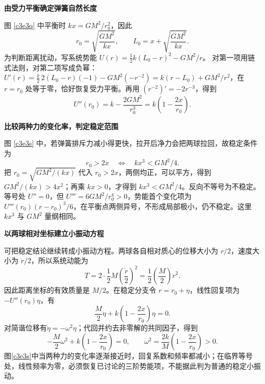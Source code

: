 \begin{solution}\textbf{由受力平衡确定弹簧自然长度}\par\nobreak
图 \ref{c3e3q} 中平衡时 $kx=GM^2/r_0^2$，因此
\[
 r_0=\sqrt{\frac{GM^2}{kx}},\qquad
 \boxed{L_0=x+\sqrt{\frac{GM^2}{kx}}}.
\]
为判断距离扰动，写系统势能
$U(r)=\tfrac12k(L_0-r)^2-GM^2/r$。
对第一项用链式法则，对第二项写成负幂：$U'(r)=\frac k2\,2(L_0-r)(-1)-GM^2(-r^{-2})=k(r-L_0)+GM^2/r^2$，在 $r=r_0$ 处等于零，恰好恢复受力平衡。再用 $(r^{-2})'=-2r^{-3}$，得到
\[
 U''(r_0)=k-\frac{2GM^2}{r_0^3}
 =k\left(1-\frac{2x}{r_0}\right).
\]



\par\medskip{}\noindent\textbf{比较两种力的变化率，判定稳定范围}\par\nobreak
图 \ref{c3e3s} 中，若弹簧排斥力减小得更快，拉开后净力会把两球拉回，故稳定条件为
\[
 r_0>2x\quad\Longleftrightarrow\quad
 \boxed{kx^3<GM^2/4}.
\]
把 $r_0=\sqrt{GM^2/(kx)}$ 代入 $r_0>2x$，两侧均正，可以平方，得到 $GM^2/(kx)>4x^2$；再乘 $kx>0$，才得到 $kx^3<GM^2/4$。反向不等号为不稳定。等号处 $U''=0$，但 $U'''=6GM^2/r_0^4>0$，势能首个变化项为 $U'''(r_0)(r-r_0)^3/6$，在平衡点两侧异号，不形成局部极小，仍不稳定。这里 $kx^3$ 与 $GM^2$ 量纲相同。


\par\medskip{}\noindent\textbf{以两球相对坐标建立小振动方程}\par\nobreak
可把稳定结论继续转成小振动方程。两球各自相对质心的位移大小为 $r/2$，速度大小为 $\dot r/2$，所以系统动能为
\[T=2\cdot\frac12M\left(\frac{\dot r}{2}\right)^2
   =\frac12\left(\frac M2\right)\dot r^2.\]
因此距离坐标的有效质量是 $M/2$。在稳定分支令 $r=r_0+\eta$，线性回复项为 $-U''(r_0)\eta$，有
\[\frac M2\ddot\eta+k\left(1-\frac{2x}{r_0}\right)\eta=0.\]
对简谐位移有$\ddot\eta=-\omega^2\eta$；代回并约去非零解的共同因子，得到
\[
-\frac M2\omega^2+k\left(1-\frac{2x}{r_0}\right)=0,
\qquad \omega^2=\frac{2k}{M}\left(1-\frac{2x}{r_0}\right)>0.
\]
图\ref{c3e3s}中当两种力的变化率逐渐接近时，回复系数和频率都减小；在临界等号处，线性频率为零，必须恢复已讨论的三阶势能项，不能据此判为普通的稳定小振动。
\end{solution}

